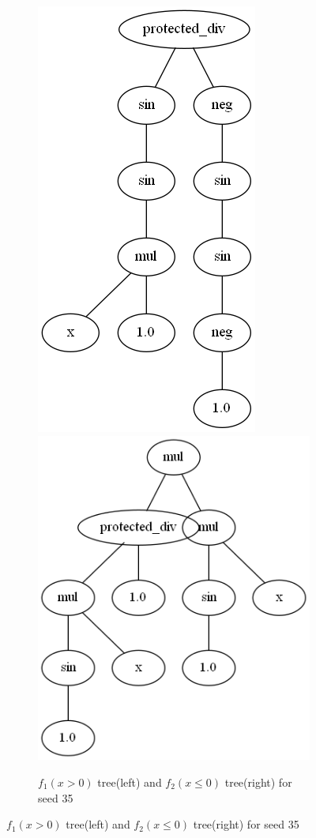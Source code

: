 \documentclass{article}
\begin{document}
\begin{figure}[h!]
	\centering
	\begin{subfigure}[b]{\linewidth}
		\includegraphics[width=0.5\linewidth]{ccgp_best_tree_35_1.png}
		\includegraphics[width=0.5\linewidth]{ccgp_best_tree_35_2.png}
		\caption{$f_1(x > 0)$ tree(left) and $f_2(x \le 0)$ tree(right) for seed 35}
	\end{subfigure}
\end{figure}
\end{document}
